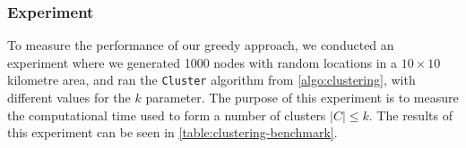 
\subsubsection{Experiment}\label{sec:clustering:experiments}
To measure the performance of our greedy approach, we conducted an experiment where we generated 1000 nodes with random locations in a $10 \times 10$ kilometre area, and ran the \texttt{Cluster} algorithm from \autoref{algo:clustering}, with different values for the $k$ parameter. The purpose of this experiment is to measure the computational time used to form a number of clusters $|C| \leq k$. The results of this experiment can be seen in \autoref{table:clustering-benchmark}.



